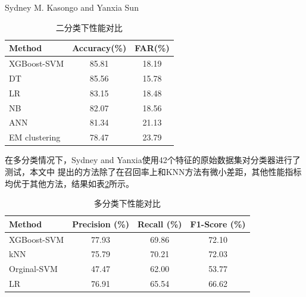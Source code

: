 \documentclass{article}
\begin{document}
Sydney M. Kasongo  and Yanxia Sun
\begin{table}[H]
  \caption{二分类下性能对比}
  \label{table:compare1}
  \centering
  \begin{tabular}{lcc}
    \toprule
      Method        & Accuracy(\%)  & FAR(\%) \\ \midrule
    XGBoost-SVM     & 85.81    & 18.19  \\    
    DT     & 85.56   & 15.78  \\    
    LR     & 83.15   & 18.48  \\    
    NB     & 82.07   & 18.56  \\   
    ANN     & 81.34   & 21.13  \\      
    EM clustering    & 78.47   & 23.79   \\\bottomrule 
  \end{tabular}
\end{table}
在多分类情况下，Sydney and Yanxia使用42个特征的原始数据集对分类器进行了测试\cite{ref2}，本文中
提出的方法除了在召回率上和KNN方法有微小差距，其他性能指标均优于其他方法，结果如表\ref{table:compare2}所示。
\begin{table}[H]
  \caption{多分类下性能对比}
  \label{table:compare2}
  \centering
  \begin{tabular}{lccc}
    \toprule
      Method & Precision (\%) & Recall (\%) & F1-Score (\%) \\ \midrule
      XGBoost-SVM & 77.93 & 69.86 & 72.10 \\
      kNN & 75.79 & 70.21 & 72.03 \\
      Orginal-SVM & 47.47 & 62.00 & 53.77 \\
      LR & 76.91 & 65.54 & 66.62 \\ \bottomrule 
  \end{tabular}
\end{table}
\end{document}
